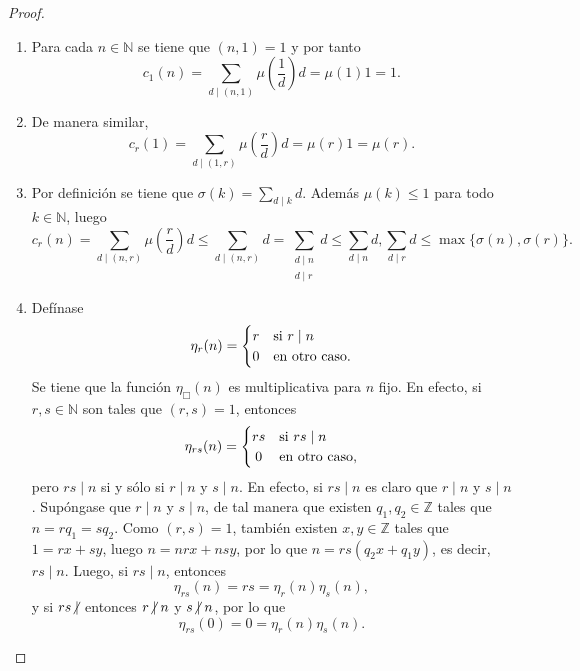 \begin{proof}
\begin{enumerate}[label=\textnormal{(\arabic*)}]
\item Para cada $n \in \mathbb{N}$ se tiene que $(n,1)=1$ y por tanto
    \begin{equation*}
        c_1(n) = \sum_{d \mid (n,1)} \mu \left( \frac{1}{d} \right) d = \mu(1) 1 = 1.
    \end{equation*}
\item De manera similar,
    \begin{equation*}
        c_r(1) = \sum_{d \mid (1,r)} \mu \left( \frac{r}{d} \right) d = \mu(r) 1 = \mu(r).
    \end{equation*}
\item Por definición se tiene que $\sigma(k) = \sum_{d \mid k} d$. Además $\mu(k) \le 1$ para todo $k \in \mathbb{N}$, luego
    \begin{equation*}
        c_r(n) = \sum_{d \mid (n,r)} \mu \left( \frac{r}{d} \right) d \le \sum_{d \mid (n,r)} d = \sum_{\substack{d \mid n \\ d \mid r}} d \le \sum_{d \mid n} d, \sum_{d \mid r} d \le \max \{ \sigma(n),\sigma(r) \}.
    \end{equation*}
\item Defínase
    \begin{equation*}
        \eta_r(n) = \begin{cases}
            \hfil r & \text{si } r \mid n \\
            \hfil 0 & \text{en otro caso}.
        \end{cases}
    \end{equation*}
Se tiene que la función $\eta_\Box(n)$ es multiplicativa para $n$ fijo. En efecto, si $r,s \in \mathbb{N}$ son tales que $(r,s)=1$, entonces
\begin{equation*}
    \eta_{r s}(n) = \begin{cases}
        \hfil r s & \text{si } r s \mid n \\
        \hfil 0 & \text{en otro caso,}
    \end{cases}
\end{equation*}
pero $r s \mid n$ si y sólo si $r \mid n$ y $s \mid n$. En efecto, si $r s \mid n$ es claro que $r \mid n$ y $s \mid n$. Supóngase que $r \mid n$ y $s \mid n$, de tal manera que existen $q_1, q_2 \in \mathbb{Z}$ tales que $n=r q_1=s q_2$. Como $(r,s)=1$, también existen $x, y \in \mathbb{Z}$ tales que $1=r x + s y$, luego $n=n r x + n s y$, por lo que $n= r s (q_2 x + q_1 y)$, es decir, $r s \mid n$. Luego, si $r s \mid n$, entonces
\begin{equation*}
    \eta_{r s}(n) = r s = \eta_r(n) \eta_s(n),
\end{equation*}
y si $r s \centernot\mid$ entonces $r \centernot\mid n$ y $s \centernot\mid n$, por lo que
\begin{equation*}
    \eta_{r s}(0) = 0 = \eta_r(n) \eta_s(n).
\end{equation*}


\end{enumerate}
\end{proof}
